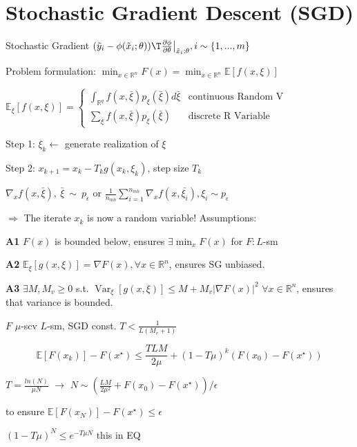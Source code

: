 \section{Stochastic Gradient Descent (SGD)}

Stochastic Gradient
$(\tilde{y}_i - \phi(\tilde{x}_i;\theta))\T
	\frac{\partial\phi}{\partial\theta}\big|_{\tilde{x}_i;\theta}
	,i\sim\{1,...,m\}$

Problem formulation:
$\min _{x \in \mathbb{R}^{n}} F(x)
	= \min _{x \in \mathbb{R}^{n}} \mathbb{E} [f(x,\xi)]$




$\mathbb{E}_\xi[f(x,\xi)]=
	\begin{cases}
		\int_{\mathbb{R}^{q}}f(x,\bar{\xi})p_\xi(\bar\xi)d\bar{\xi}
		 & \text{continuous Random V}
		\\
		\sum_{\bar{\xi}}f(x,\bar{\xi})p_\xi(\bar\xi)
		 & \text{discrete R Variable}
	\end{cases}$

Step 1: $\xi_k \leftarrow$ generate realization of $\xi$

Step 2: $x_{k+1} = x_k - T_k  g(x_k,\xi_k)$, step size $T_k$

$\nabla_xf(x,\bar{\xi}),\ \bar{\xi}\ \sim \ p_\epsilon$
or
$\frac{1}{n_{mb}}\sum_{i=1}^{n_{mb}}\nabla_xf(x,\bar{\xi_i}), \xi_i \sim p_\epsilon$

$\Rightarrow$ The iterate $x_k$ is now a random variable!
Assumptions:

\textbf{A1} $F(x)$ is bounded below,
ensures $\exists\min_{x}F(x)$ for $F:L$-sm

\textbf{A2} $\mathbb{E}_\xi[g(x,\xi)]=\nabla F(x),
	\forall x \in \mathbb{R}^{n}$,
ensures SG unbiased.

\textbf{A3} $\exists M,M_v\ge0$ s.t.
$\operatorname{Var}_{\xi}[g(x,\xi)]\le
	M+M_v|\nabla F(x)|^2$
$\forall x\in\mathbb{R}^{n}$,
ensures that variance is bounded.

\begin{proposition}
	$F$ $\mu$-scv $L$-sm,
	SGD const.
	$T<\frac{1}{L(M_v + 1)}$

	$$\mathbb{E}[F(x_k)]-F(x^\star)\le
		\frac{TLM}{2\mu}+(1-T\mu)^k(F(x_0)-F(x^\star))$$

	$T=\frac{ln(N)}{\mu N}$
	$\rightarrow$
	$N\sim\left(\frac{LM}{2\mu^2}+F(x_0)-F(x^\star)\right)/\epsilon$

	to ensure
	$\mathbb{E}[F(x_N)] - F(x^\star)\le\epsilon$
\end{proposition}

$(1-T\mu)^N\le e^{-T\mu N}$ this  in EQ

